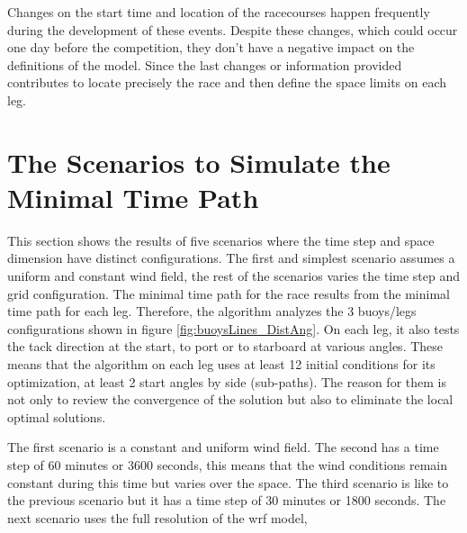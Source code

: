 Changes on the start time and location of the racecourses happen frequently during the development of these events. Despite these changes, which could occur one day before the competition, they don't have a negative impact on the definitions of the model. Since the last changes or information provided contributes to locate precisely the race and then define the space limits on each leg.\par
\section{The Scenarios to Simulate the Minimal Time Path} \label{sec:wind_area_and_course_area}
This section shows the results of five scenarios where the time step and space dimension have distinct configurations. The first and simplest scenario assumes a uniform and constant wind field, the rest of the scenarios varies the time step and grid configuration. %
The minimal time path for the race results from the minimal time path for each leg. Therefore, the algorithm analyzes the 3 buoys/legs configurations shown in figure \ref{fig:buoysLines_DistAng}. On each leg, it also tests the tack direction at the start, to port or to starboard at various angles. These means that the algorithm on each leg uses at least 12 initial conditions for its optimization, at least 2 start angles by side (sub-paths). The reason for them is not only to review the convergence of the solution but also to eliminate the local optimal solutions. \par 
The first scenario is a constant and uniform wind field. The second has a time step of 60 minutes or 3600 seconds, this means that the wind conditions remain constant during this time but varies over the space. The third scenario is like to the previous scenario but it has a time step of 30 minutes or 1800 seconds. The next scenario uses the full resolution of the \acrshort{wrf} model, %
